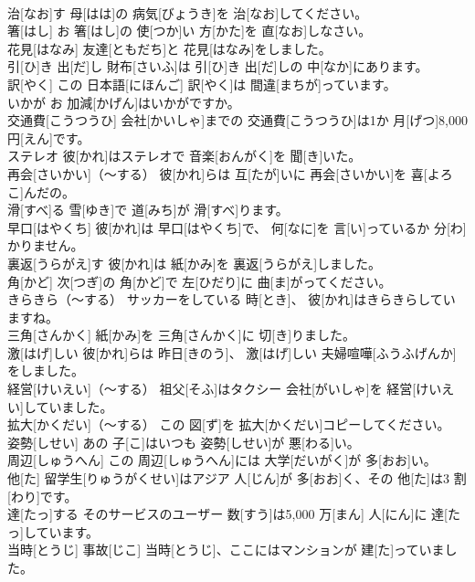 \documentclass[8pt]{extreport}
\begin{document}
\begin{CJK}{UTF8}{min}
\\	治[なお]す	母[はは]の 病気[びょうき]を 治[なお]してください。		
\\	箸[はし]	お 箸[はし]の 使[つか]い 方[かた]を 直[なお]しなさい。		
\\	花見[はなみ]	友達[ともだち]と 花見[はなみ]をしました。		
\\	引[ひ]き 出[だ]し	財布[さいふ]は 引[ひ]き 出[だ]しの 中[なか]にあります。		
\\	訳[やく]	この 日本語[にほんご] 訳[やく]は 間違[まちが]っています。		
\\	いかが	お 加減[かげん]はいかがですか。		
\\	交通費[こうつうひ]	会社[かいしゃ]までの 交通費[こうつうひ]は1か 月[げつ]8,000 円[えん]です。		
\\	ステレオ	彼[かれ]はステレオで 音楽[おんがく]を 聞[き]いた。		
\\	再会[さいかい]（～する）	彼[かれ]らは 互[たが]いに 再会[さいかい]を 喜[よろこ]んだの。		
\\	滑[すべ]る	雪[ゆき]で 道[みち]が 滑[すべ]ります。		
\\	早口[はやくち]	彼[かれ]は 早口[はやくち]で、 何[なに]を 言[い]っているか 分[わ]かりません。		
\\	裏返[うらがえ]す	彼[かれ]は 紙[かみ]を 裏返[うらがえ]しました。		
\\	角[かど]	次[つぎ]の 角[かど]で 左[ひだり]に 曲[ま]がってください。		
\\	きらきら（～する）	サッカーをしている 時[とき]、 彼[かれ]はきらきらしていますね。		
\\	三角[さんかく]	紙[かみ]を 三角[さんかく]に 切[き]りました。		
\\	激[はげ]しい	彼[かれ]らは 昨日[きのう]、 激[はげ]しい 夫婦喧嘩[ふうふげんか]をしました。		
\\	経営[けいえい]（～する）	祖父[そふ]はタクシー 会社[がいしゃ]を 経営[けいえい]していました。		
\\	拡大[かくだい]（～する）	この 図[ず]を 拡大[かくだい]コピーしてください。		
\\	姿勢[しせい]	あの 子[こ]はいつも 姿勢[しせい]が 悪[わる]い。		
\\	周辺[しゅうへん]	この 周辺[しゅうへん]には 大学[だいがく]が 多[おお]い。		
\\	他[た]	留学生[りゅうがくせい]はアジア 人[じん]が 多[おお]く、その 他[た]は3 割[わり]です。		
\\	達[たっ]する	そのサービスのユーザー 数[すう]は5,000 万[まん] 人[にん]に 達[たっ]しています。		
\\	当時[とうじ]	事故[じこ] 当時[とうじ]、ここにはマンションが 建[た]っていました。		

\end{CJK}
\end{document}
